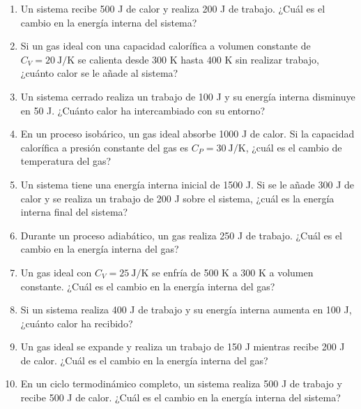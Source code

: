 \documentclass[../main]{subfiles}
\begin{document}
\begin{enumerate}
    \item Un sistema recibe 500 J de calor y realiza 200 J de trabajo. ¿Cuál es el cambio en la energía interna del sistema?
    \item Si un gas ideal con una capacidad calorífica a volumen constante de $C_V = 20 \ \text{J/K}$ se calienta desde 300 K hasta 400 K sin realizar trabajo, ¿cuánto calor se le añade al sistema?
    \item Un sistema cerrado realiza un trabajo de 100 J y su energía interna disminuye en 50 J. ¿Cuánto calor ha intercambiado con su entorno?
    \item En un proceso isobárico, un gas ideal absorbe 1000 J de calor. Si la capacidad calorífica a presión constante del gas es $C_P = 30 \ \text{J/K}$, ¿cuál es el cambio de temperatura del gas?
    \item Un sistema tiene una energía interna inicial de 1500 J. Si se le añade 300 J de calor y se realiza un trabajo de 200 J sobre el sistema, ¿cuál es la energía interna final del sistema?
    \item Durante un proceso adiabático, un gas realiza 250 J de trabajo. ¿Cuál es el cambio en la energía interna del gas?
    \item Un gas ideal con $C_V = 25 \ \text{J/K}$ se enfría de 500 K a 300 K a volumen constante. ¿Cuál es el cambio en la energía interna del gas?
    \item Si un sistema realiza 400 J de trabajo y su energía interna aumenta en 100 J, ¿cuánto calor ha recibido?
    \item Un gas ideal se expande y realiza un trabajo de 150 J mientras recibe 200 J de calor. ¿Cuál es el cambio en la energía interna del gas?
    \item En un ciclo termodinámico completo, un sistema realiza 500 J de trabajo y recibe 500 J de calor. ¿Cuál es el cambio en la energía interna del sistema?

\end{enumerate}
\end{document}
